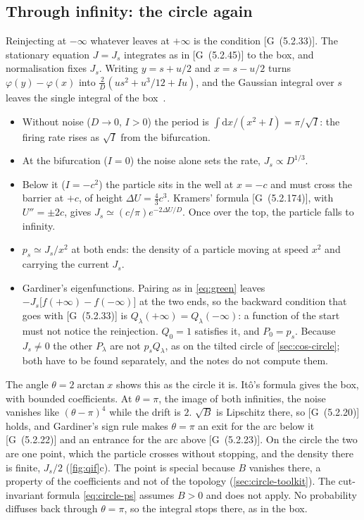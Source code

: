 \documentclass[11pt]{article}
\numberwithin{equation}{section}
\newcommand{\dd}{\mathrm{d}}
\newcommand{\G}[1]{[G~(#1)]}
\begin{document}
\subsection{Through infinity: the circle again}

Reinjecting at $-\infty$ whatever leaves at $+\infty$ is the condition \G{5.2.33}. The stationary equation
$J=J_s$ integrates as in \G{5.2.45} to the box, and normalisation fixes $J_s$. Writing $y=s+u/2$ and $x=s-u/2$ turns
$\varphi(y)-\varphi(x)$ into $\frac2D(us^2+u^3/12+Iu)$, and the Gaussian integral over $s$ leaves the single integral
of the box~\cite{lindner}.
\begin{itemize}
  \item Without noise ($D\to0$, $I>0$) the period is $\int\dd x/(x^2+I)=\pi/\sqrt I$: the firing rate rises as
        $\sqrt I$ from the bifurcation.
  \item At the bifurcation ($I=0$) the noise alone sets the rate, $J_s\propto D^{1/3}$.
  \item Below it ($I=-c^2$) the particle sits in the well at $x=-c$ and must cross the barrier at $+c$, of height
        $\Delta U=\frac43c^3$. Kramers' formula \G{5.2.174}, with $U''=\pm2c$, gives $J_s\simeq(c/\pi)e^{-2\Delta U/D}$.
        Once over the top, the particle falls to infinity.
  \item $p_s\simeq J_s/x^2$ at both ends: the density of a particle moving at speed $x^2$ and carrying the current
        $J_s$.
  \item Gardiner's eigenfunctions. Pairing as in \cref{eq:green} leaves $-J_s\bigl[f(+\infty)-f(-\infty)\bigr]$ at the
        two ends, so the backward condition that goes with \G{5.2.33} is $Q_\lambda(+\infty)=Q_\lambda(-\infty)$:
        a function of the start must not notice the reinjection. $Q_0=1$ satisfies it, and $P_0=p_s$. Because
        $J_s\neq0$ the other $P_\lambda$ are not $p_sQ_\lambda$, as on the tilted circle of \cref{sec:cos-circle};
        both have to be found separately, and the notes do not compute them.
\end{itemize}

The angle $\theta=2\arctan x$ shows this as the circle it is. Itô's formula gives the box, with bounded
coefficients. At $\theta=\pi$, the image of both infinities, the noise vanishes like $(\theta-\pi)^4$ while the drift
is $2$. $\sqrt B$ is Lipschitz there, so \G{5.2.20} holds, and Gardiner's sign rule makes $\theta=\pi$ an exit for the
arc below it \G{5.2.22} and an entrance for the arc above \G{5.2.23}. On the circle the two are one point, which the
particle crosses without stopping, and the density there is finite, $J_s/2$ (\cref{fig:qif}c). The point is special
because $B$ vanishes there, a property of the coefficients and not of the topology (\cref{sec:circle-toolkit}). The
cut-invariant formula \cref{eq:circle-ps} assumes $B>0$ and does not apply. No probability diffuses back through
$\theta=\pi$, so the integral stops there, as in the box.
\end{document}

